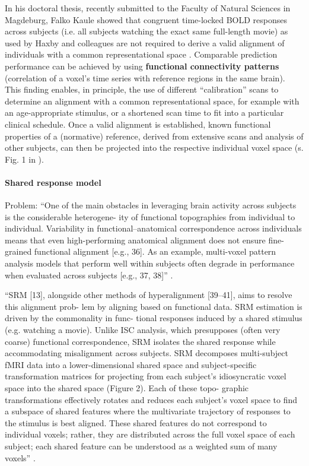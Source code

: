 %
In his doctoral thesis, recently submitted to the Faculty of Natural Sciences in
Magdeburg, Falko Kaule showed that congruent time-locked BOLD responses across
subjects (i.e. all subjects watching the exact same full-length movie) as used
by Haxby and colleagues are not required to derive a valid alignment of
individuals with a common representational space \citep{kaule2017examination}.
%
Comparable prediction performance can be achieved by using \textbf{functional
connectivity patterns} (correlation of a voxel's time series with reference
regions in the same brain).
%
This finding enables, in principle, the use of different ``calibration'' scans
to determine an alignment with a common representational space, for example with
an age-appropriate stimulus, or a shortened scan time to fit into a particular
clinical schedule.
%
Once a valid alignment is established, known functional properties of a
(normative) reference, derived from extensive scans and analysis of other
subjects, can then be projected into the respective individual voxel space (s.
Fig. 1 in \citep{nishimoto2016lining}).


\paragraph{Shared response model}


Problem: ``One of the main obstacles in leveraging brain activity across
subjects is the considerable heterogene- ity of functional topographies from
individual to individual. Variability in functional–anatomical correspondence
across individuals means that even high-performing anatomical alignment does not
ensure fine-grained functional alignment [e.g., 36]. As an example, multi-voxel
pattern analysis models that perform well within subjects often degrade in
performance when evaluated across subjects [e.g., 37, 38]''
\citep{kumar2020brainiak}.

``SRM [13], alongside other methods of hyperalignment [39–41], aims to resolve
this alignment prob- lem by aligning based on functional data. SRM estimation is
driven by the commonality in func- tional responses induced by a shared stimulus
(e.g. watching a movie). Unlike ISC analysis, which presupposes (often very
coarse) functional correspondence, SRM isolates the shared response while
accommodating misalignment across subjects. SRM decomposes multi-subject fMRI
data into a lower-dimensional shared space and subject-specific transformation
matrices for projecting from each subject’s idiosyncratic voxel space into the
shared space (Figure 2). Each of these topo- graphic transformations effectively
rotates and reduces each subject’s voxel space to find a subspace of shared
features where the multivariate trajectory of responses to the stimulus is best
aligned. These shared features do not correspond to individual voxels; rather,
they are distributed across the full voxel space of each subject; each shared
feature can be understood as a weighted sum of many voxels''
\citep{kumar2020brainiak}.

